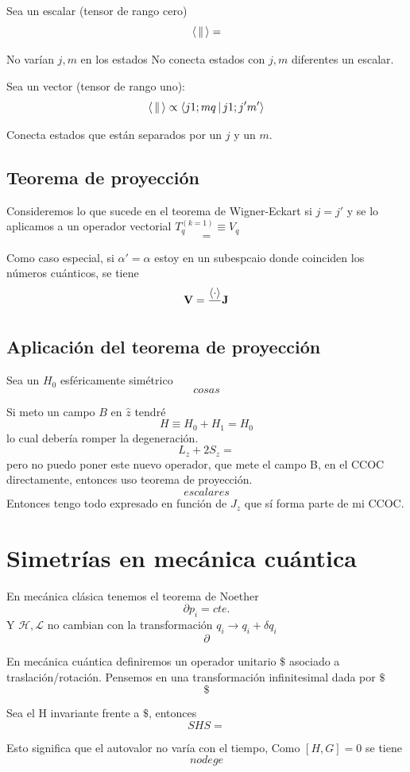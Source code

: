 \documentclass[10pt,oneside]{CBFT_book}
\begin{document}
Sea un escalar (tensor de rango cero)
\[
	\Braket{||} =
\]

No varían $j,m$ en los estados No conecta estados con $j,m$ diferentes un escalar.

Sea un vector (tensor de rango uno):
\[
	\Braket{||} \propto \Braket{j 1;m q|j 1;j' m'}
\]

Conecta estados que están separados por un $j$ y un $m$.

\subsection{Teorema de proyección}

Consideremos lo que sucede en el teorema de Wigner-Eckart si $j=j'$ y se lo aplicamos a un operador vectorial 
$T_q^{(k=1)} \equiv V_q$
\[
	=
\]

Como caso especial, si $\alpha' =\alpha$ estoy en un subespcaio donde coinciden los números cuánticos, se 
tiene
\[
	\vb{V} = \frac{\Braket{\cdot}}{} \vb{J}
\]

\subsection{Aplicación del teorema de proyección}

Sea un $H_0$ esféricamente simétrico 
\[
	cosas
\]

Si meto un campo $B$ en $\hat{z}$ tendré 
\[
	H \equiv H_0 + H_1 = H_0
\]
lo cual debería romper la degeneración.
\[
	L_z + 2S_z =
\]
pero no puedo poner este nuevo operador, que mete el campo B, en el CCOC directamente, entonces uso teorema 
de proyección.
\[
	escalares
\]
Entonces tengo todo expresado en función de $J_z$ que sí forma parte de mi CCOC.


\section{Simetrías en mecánica cuántica}

En mecánica clásica tenemos el teorema de Noether 
\[
	\partial p_i = cte.
\]
Y $\mathcal{H}, \mathcal{L}$ no cambian con la transformación $q_i \longrightarrow q_i + \delta q_i$
\[
	\partial 
\]

En mecánica cuántica definiremos un operador unitario $\$$ asociado a traslación/rotación. Pensemos en una 
transformación infinitesimal dada por $\$$
\[
	\$
\]

Sea el H invariante frente a $\$$, entonces 
\[
	SHS =
\]

Esto significa que el autovalor no varía con el tiempo, Como $[H,G]=0$ se tiene 
\[
	no dege 
\]
\end{document}
